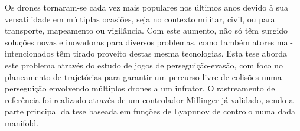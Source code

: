 
%
Os drones tornaram-se cada vez mais populares nos últimos anos devido à sua versatilidade em múltiplas ocasiões, seja no contexto militar, civil, ou para transporte, mapeamento ou vigilância. Com este aumento, não só têm surgido soluções novas e inovadoras para diversos problemas, como também atores mal-intencionados têm tirado proveito destas mesma tecnologias.
Esta tese aborda este problema através do estudo de jogos de perseguição-evasão, com foco no planeamento de trajetórias para garantir um percurso livre de colisões numa perseguição envolvendo múltiplos drones a um infrator. O rastreamento de referência foi realizado através de um controlador Millinger já validado, sendo a parte principal da tese baseada em funções de Lyapunov de controlo numa dada manifold.

